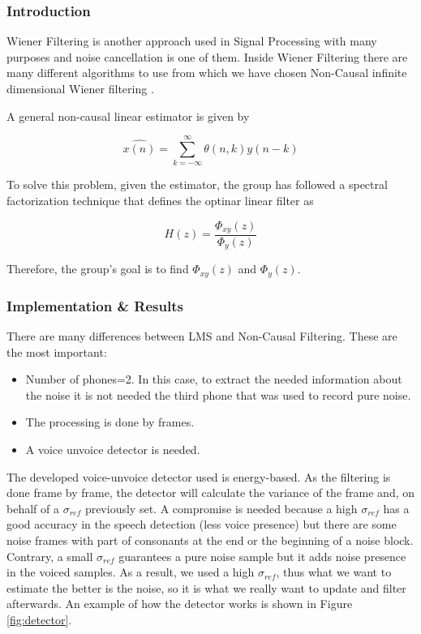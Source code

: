 \documentclass[11pt,a4paper,spanish]{book}  %
\theoremstyle{definition}  %
\theoremstyle{plain}  %
\theoremstyle{remark}  %
\begin{document}
	\subsubsection{Introduction}
	
	
	Wiener Filtering is another approach used in Signal Processing with many purposes and noise cancellation is one of them. Inside Wiener Filtering there are many different algorithms to use from which we have chosen Non-Causal infinite dimensional Wiener filtering \cite{asp}.
	
	A general non-causal linear estimator is given by 
	
	
	\begin{equation}
	\label{eq:nonc1}
		\hat{x(n)} = \sum \limits_{k=-\infty}^\infty \theta(n,k)y(n-k)
	\end{equation}
	
	To solve this problem, given the estimator, the group has followed a spectral factorization technique that defines the optinar linear filter as
	
		\begin{equation}
	\label{eq:nonc1}
		H(z)=\frac{\Phi_{xy}(z)}{\Phi_{y}(z)}
	\end{equation}
	
	Therefore, the group's goal is to find $\Phi_{xy}(z)$ and $\Phi_{y}(z)$.
	
	
	\subsubsection{Implementation \& Results}
	
		There are many differences between LMS and Non-Causal Filtering. These are the most important:
		
		\begin{itemize}
		\item Number of phones=2. In this case, to extract the needed information about the noise it is not needed the third phone that was used to record pure noise.
		
		\item The processing is done by frames.
		
		\item A voice unvoice detector is needed.
		\end{itemize}
		
		The developed voice-unvoice detector used is energy-based. As the filtering is done frame by frame, the detector will calculate the variance of the frame and, on behalf of a $\sigma_{ref}$ previously set. A compromise is needed because a high $\sigma_{ref}$ has a good accuracy in the speech detection (less voice presence) but there are some noise frames with part of consonants at the end or the beginning of a noise block. Contrary, a small $\sigma_{ref}$ guarantees a pure noise sample but it adds noise presence in the voiced samples. As a result, we used a high $\sigma_{ref}$, thus what we want to estimate the better is the noise, so it is what we really want to update and filter afterwards.  An example of how the detector works is shown in Figure \ref{fig:detector}.
		
\end{document}

